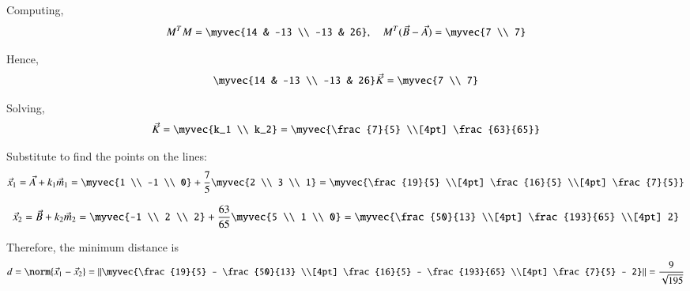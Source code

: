 \documentclass[journal]{IEEEtran}
\begin{document}
Computing,
\begin{align}
M^T M = 
\myvec{14 & -13 \\ -13 & 26}, \quad
M^T(\vec{B} - \vec{A}) = 
\myvec{7 \\ 7}
\end{align}

Hence,
\begin{align}
\myvec{14 & -13 \\ -13 & 26}\vec{K} = \myvec{7 \\ 7}
\end{align}

Solving,
\begin{align}
\vec{K} = \myvec{k_1 \\ k_2} 
= \myvec{\frac{7}{5} \\[4pt] \frac{63}{65}}
\end{align}

Substitute to find the points on the lines:
\begin{align}
\vec{x}_1 = \vec{A} + k_1 \vec{m}_1 
= \myvec{1 \\ -1 \\ 0} + \frac{7}{5}\myvec{2 \\ 3 \\ 1}
= \myvec{\frac{19}{5} \\[4pt] \frac{16}{5} \\[4pt] \frac{7}{5}}
\end{align}

\begin{align}
\vec{x}_2 = \vec{B} + k_2 \vec{m}_2 
= \myvec{-1 \\ 2 \\ 2} + \frac{63}{65}\myvec{5 \\ 1 \\ 0}
= \myvec{\frac{50}{13} \\[4pt] \frac{193}{65} \\[4pt] 2}
\end{align}

Therefore, the minimum distance is
\begin{align}
d = \norm{\vec{x}_1 - \vec{x}_2} 
= \left\|\myvec{\frac{19}{5} - \frac{50}{13} \\[4pt]
\frac{16}{5} - \frac{193}{65} \\[4pt]
\frac{7}{5} - 2}\right\| 
= \frac{9}{\sqrt{195}}
\end{align}

\begin{center}
\end{center}
\end{document}
